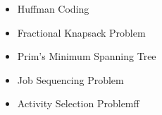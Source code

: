 \begin{itemize}
    \item  Huffman Coding
    \item  Fractional Knapsack Problem
    \item Prim's Minimum Spanning Tree
    \item Job Sequencing Problem
    \item Activity Selection Problemff
 
\end{itemize}

